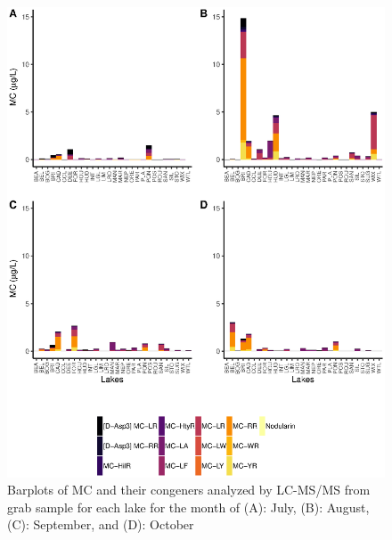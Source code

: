 \begin{figure}[p] 
	\includegraphics[width=\textwidth]{figures/month}
	\caption{
Barplots of MC and their congeners analyzed by LC-MS/MS from grab sample for each lake for the month of 
(A): July, 
(B): August,
(C): September, and
(D): October 
}
	\label{fig:month} 
\end{figure}

